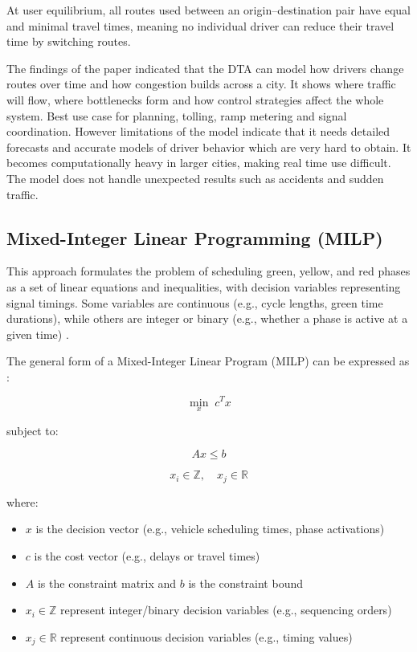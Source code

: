 ﻿\documentclass[11pt, a4paper]{report}
\begin{document}
At user equilibrium, all routes used between an origin--destination pair have equal and minimal travel times, meaning no individual driver can reduce their travel time by switching routes.

The findings of the paper \cite{elimadi2024review} indicated that the DTA can model how drivers change routes over time and how congestion builds across a city. It shows where traffic will flow, where bottlenecks form and how control strategies affect the whole system. Best use case for planning, tolling, ramp metering and signal coordination. However limitations of the model indicate that it needs detailed forecasts and accurate models of driver behavior which are very hard to obtain. It becomes computationally heavy in larger cities, making real time use difficult. The model does not handle unexpected results such as accidents and sudden traffic.

\subsection{Mixed-Integer Linear Programming (MILP)}

This approach formulates the problem of scheduling green, yellow, and red phases as a set of linear equations and inequalities, with decision variables representing signal timings. Some variables are continuous (e.g., cycle lengths, green time durations), while others are integer or binary (e.g., whether a phase is active at a given time) \cite{guilliard2016nonhomogeneous}.

The general form of a Mixed-Integer Linear Program (MILP) can be expressed as \cite{ye2019survey}:

\begin{equation}
\min_{x} \; c^T x
\label{eq:milp-objective}
\end{equation}

subject to:

\begin{equation}
Ax \leq b
\label{eq:milp-constraint1}
\end{equation}

\begin{equation}
x_i \in \mathbb{Z}, \quad x_j \in \mathbb{R}
\label{eq:milp-constraint2}
\end{equation}

where:

\begin{itemize}
    \item $x$ is the decision vector (e.g., vehicle scheduling times, phase activations)
    \item $c$ is the cost vector (e.g., delays or travel times)
    \item $A$ is the constraint matrix and $b$ is the constraint bound
    \item $x_i \in \mathbb{Z}$ represent integer/binary decision variables (e.g., sequencing orders)
    \item $x_j \in \mathbb{R}$ represent continuous decision variables (e.g., timing values)
\end{itemize}
\end{document}
